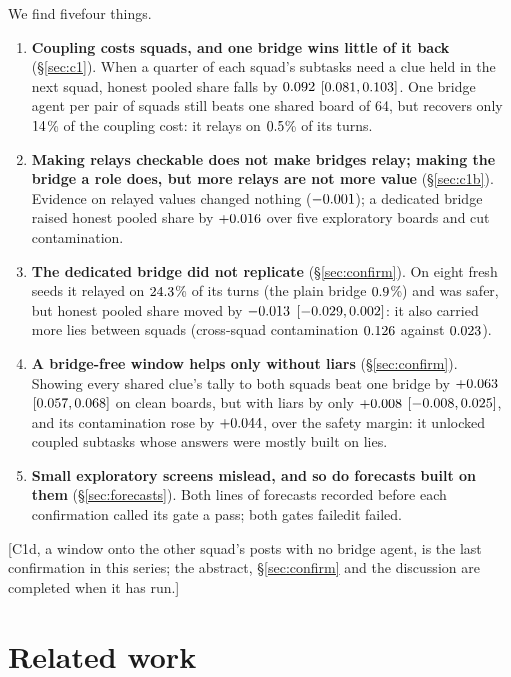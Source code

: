 \documentclass{article}
\newcommand{\pending}[1]{\textcolor{orange!70!black}{[#1]}}
\begin{document}
We find \ifCOneD five\else four\fi{} things.
\begin{enumerate}
\item \textbf{Coupling costs squads, and one bridge wins little of it back} (\S\ref{sec:c1}). When a quarter of each squad's subtasks need a clue held in the next squad, honest pooled share falls by $0.092$ $[0.081, 0.103]$. One bridge agent per pair of squads still beats one shared board of 64, but recovers only $14$\% of the coupling cost: it relays on $0.5$\% of its turns.
\item \textbf{Making relays checkable does not make bridges relay; making the bridge a role does, but more relays are not more value} (\S\ref{sec:c1b}). Evidence on relayed values changed nothing ($-0.001$); a dedicated bridge raised honest pooled share by $+0.016$ over five exploratory boards and cut contamination.
\item \textbf{The dedicated bridge did not replicate} (\S\ref{sec:confirm}). On eight fresh seeds it relayed on $24.3$\% of its turns (the plain bridge $0.9$\%) and was safer, but honest pooled share moved by $-0.013$ $[-0.029, 0.002]$: it also carried more lies between squads (cross-squad contamination $0.126$ against $0.023$).
\ifCOneD
\item \textbf{A bridge-free window helps only without liars} (\S\ref{sec:confirm}). Showing every shared clue's tally to both squads beat one bridge by $+0.063$ $[0.057, 0.068]$ on clean boards, but with liars by only $+0.008$ $[-0.008, 0.025]$, and its contamination rose by $+0.044$, over the safety margin: it unlocked coupled subtasks whose answers were mostly built on lies.
\fi
\item \textbf{Small exploratory screens mislead, and so do forecasts built on them} (\S\ref{sec:forecasts}). Both lines of forecasts recorded before each confirmation called its gate a pass; \ifCOneD both gates failed\else it failed\fi.
\end{enumerate}
\ifCOneD
\else
\pending{C1d, a window onto the other squad's posts with no bridge agent, is the last confirmation in this series; the abstract, \S\ref{sec:confirm} and the discussion are completed when it has run.}
\fi

\section{Related work}
\end{document}
